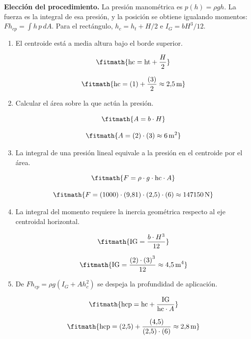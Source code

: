 \noindent\textbf{Elección del procedimiento.} La presión manométrica es $p(h)=\rho gh$. La fuerza es la integral de esa presión, y la posición se obtiene igualando momentos: $Fh_{cp}=\int h\,p\,dA$. Para el rectángulo, $h_c=h_t+H/2$ e $I_G=bH^3/12$.

\begin{enumerate}

\item El centroide está a media altura bajo el borde superior.

\[\fitmath{\mathrm{hc}=\mathrm{ht}+\frac{H}{2}}\]

\[\fitmath{\mathrm{hc}=(1)+\frac{(3)}{2}\approx 2{,}5\,\mathrm{m}}\]

\item Calcular el área sobre la que actúa la presión.

\[\fitmath{A=b\cdot H}\]

\[\fitmath{A=(2)\cdot (3)\approx 6\,\mathrm{m^{2}}}\]

\item La integral de una presión lineal equivale a la presión en el centroide por el área.

\[\fitmath{F=\rho\cdot g\cdot \mathrm{hc}\cdot A}\]

\[\fitmath{F=(1000)\cdot (9{,}81)\cdot (2{,}5)\cdot (6)\approx 147150\,\mathrm{N}}\]

\item La integral del momento requiere la inercia geométrica respecto al eje centroidal horizontal.

\[\fitmath{\mathrm{IG}=\frac{b\cdot {H}^{3}}{12}}\]

\[\fitmath{\mathrm{IG}=\frac{(2)\cdot {(3)}^{3}}{12}\approx 4{,}5\,\mathrm{m^{4}}}\]

\item De $Fh_{cp}=\rho g(I_G+Ah_c^2)$ se despeja la profundidad de aplicación.

\[\fitmath{\mathrm{hcp}=\mathrm{hc}+\frac{\mathrm{IG}}{\mathrm{hc}\cdot A}}\]

\[\fitmath{\mathrm{hcp}=(2{,}5)+\frac{(4{,}5)}{(2{,}5)\cdot (6)}\approx 2{,}8\,\mathrm{m}}\]

\end{enumerate}
